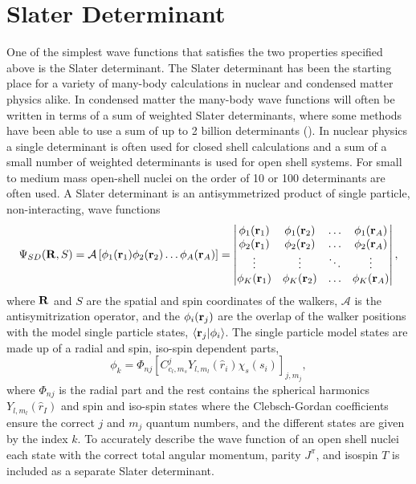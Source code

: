 \section{Slater Determinant}
One of the simplest wave functions that satisfies the two properties specified above is the Slater determinant. The Slater determinant has been the starting place for a variety of many-body calculations in nuclear and condensed matter physics alike. In condensed matter the many-body wave functions will often be written in terms of a sum of weighted Slater determinants, where some methods have been able to use a sum of up to 2 billion determinants (\cite{huron1973,li2018}). In nuclear physics a single determinant is often used for closed shell calculations and a sum of a small number  of weighted determinants is used for open shell systems. For small to medium mass open-shell nuclei on the order of 10 or 100 determinants are often used. A Slater determinant is an antisymmetrized product of single particle, non-interacting, wave functions
\begin{equation}
   \Psi_{SD}(\mathbf{R},S) = \mathcal{A} \left[\phi_1(\mathbf{r}_1)\phi_2(\mathbf{r}_2) \ldots \phi_A(\mathbf{r}_A)\right] =
   \begin{vmatrix}
      \phi_1(\mathbf{r}_1) & \phi_1(\mathbf{r}_2) & \ldots & \phi_1(\mathbf{r}_A) \\
      \phi_2(\mathbf{r}_1) & \phi_2(\mathbf{r}_2) & \ldots & \phi_2(\mathbf{r}_A) \\
      \vdots & \vdots & \ddots & \vdots \\
      \phi_K(\mathbf{r}_1) & \phi_K(\mathbf{r}_2) & \ldots & \phi_K(\mathbf{r}_A) \\
   \end{vmatrix},
\end{equation}
where $\mathbf{R}$ and $S$ are the spatial and spin coordinates of the walkers, $\mathcal{A}$ is the antisymitrization operator, and the $\phi_i(\mathbf{r}_j)$ are the overlap of the walker positions with the model single particle states, $\left< \mathbf{r}_j | \phi_i \right>$. The single particle model states are made up of a radial and spin, iso-spin dependent parts,
\begin{equation}
   \phi_k = \Phi_{nj}\left[C_{c_l,m_s}^j Y_{l,m_l}(\hat{r}_i)\chi_s(s_i)\right]_{j,m_j},
\end{equation}
where $\Phi_{nj}$ is the radial part and the rest contains the spherical harmonics $Y_{l,m_l}(\hat{r}_I)$ and spin and iso-spin states where the Clebsch-Gordan coefficients ensure the correct $j$ and $m_j$ quantum numbers, and the different states are given by the index $k$. To accurately describe the wave function of an open shell nuclei each state with the correct total angular momentum, parity $J^\pi$, and isospin $T$ is included as a separate Slater determinant.
